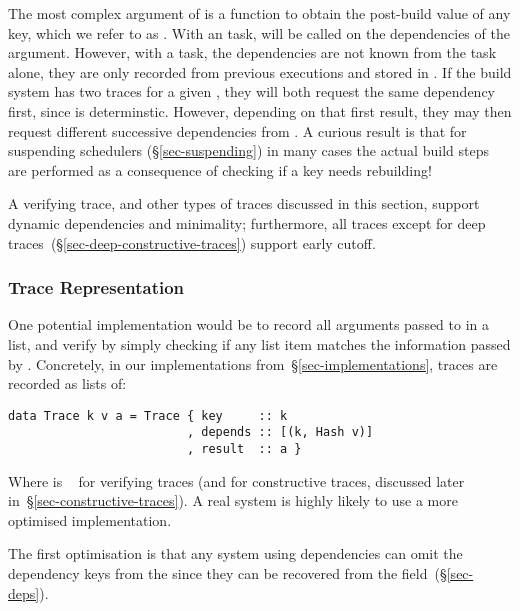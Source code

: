The most complex argument of  is a function to obtain the post-build
value of any key, which we refer to as . With an  task,
 will be called on the dependencies of the  argument. However, with a
 task, the dependencies are not known from the task alone, they are only
recorded from previous executions and stored in . If the build system has
two traces for a given , they will both request the same dependency first,
since  is determinstic. However, depending on that first result,
they may then request different successive dependencies from . A curious
result is that for suspending schedulers (\S\ref{sec-suspending}) in many cases
the actual build steps are performed as a consequence of checking if a key needs rebuilding!

A verifying trace, and other types of traces discussed in this section, support
dynamic dependencies and minimality; furthermore, all traces except for deep
traces~(\S\ref{sec-deep-constructive-traces}) support early cutoff.

\subsubsection{Trace Representation}

One potential implementation would be to record all arguments passed to
 in a list, and verify by simply checking if any list item matches
the information passed by . Concretely, in our implementations
from~\S\ref{sec-implementations}, traces are recorded as lists of:

\vspace{1mm}
\begin{verbatim}
data Trace k v a = Trace { key     :: k
                         , depends :: [(k, Hash v)]
                         , result  :: a }
\end{verbatim}
\vspace{1mm}

\noindent
Where  is ~ for verifying traces (and  for
constructive traces, discussed later in~\S\ref{sec-constructive-traces}). A real
system is highly likely to use a more optimised implementation.

The first optimisation is that any system using  dependencies
can omit the dependency keys from the  since they can be recovered
from the  field~(\S\ref{sec-deps}).

